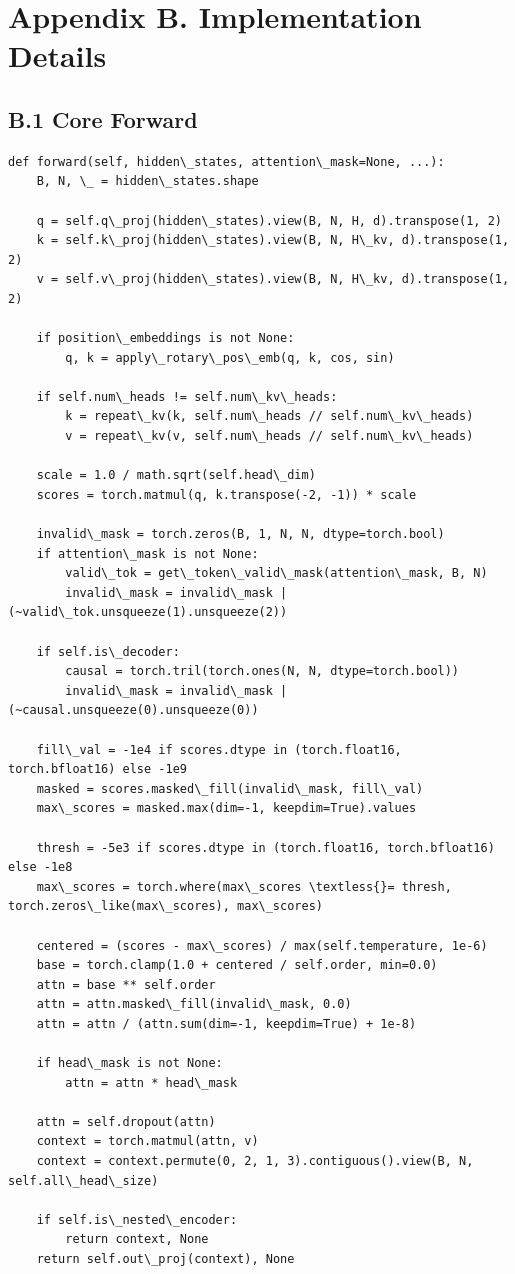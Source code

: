 \section{Appendix B. Implementation Details}

\subsection{B.1 Core Forward}

\begin{lstlisting}
def forward(self, hidden\_states, attention\_mask=None, ...):
    B, N, \_ = hidden\_states.shape
    
    q = self.q\_proj(hidden\_states).view(B, N, H, d).transpose(1, 2)
    k = self.k\_proj(hidden\_states).view(B, N, H\_kv, d).transpose(1, 2)
    v = self.v\_proj(hidden\_states).view(B, N, H\_kv, d).transpose(1, 2)
    
    if position\_embeddings is not None:
        q, k = apply\_rotary\_pos\_emb(q, k, cos, sin)
    
    if self.num\_heads != self.num\_kv\_heads:
        k = repeat\_kv(k, self.num\_heads // self.num\_kv\_heads)
        v = repeat\_kv(v, self.num\_heads // self.num\_kv\_heads)
    
    scale = 1.0 / math.sqrt(self.head\_dim)
    scores = torch.matmul(q, k.transpose(-2, -1)) * scale
    
    invalid\_mask = torch.zeros(B, 1, N, N, dtype=torch.bool)
    if attention\_mask is not None:
        valid\_tok = get\_token\_valid\_mask(attention\_mask, B, N)
        invalid\_mask = invalid\_mask | (~valid\_tok.unsqueeze(1).unsqueeze(2))
    
    if self.is\_decoder:
        causal = torch.tril(torch.ones(N, N, dtype=torch.bool))
        invalid\_mask = invalid\_mask | (~causal.unsqueeze(0).unsqueeze(0))
    
    fill\_val = -1e4 if scores.dtype in (torch.float16, torch.bfloat16) else -1e9
    masked = scores.masked\_fill(invalid\_mask, fill\_val)
    max\_scores = masked.max(dim=-1, keepdim=True).values
    
    thresh = -5e3 if scores.dtype in (torch.float16, torch.bfloat16) else -1e8
    max\_scores = torch.where(max\_scores \textless{}= thresh, torch.zeros\_like(max\_scores), max\_scores)
    
    centered = (scores - max\_scores) / max(self.temperature, 1e-6)
    base = torch.clamp(1.0 + centered / self.order, min=0.0)
    attn = base ** self.order
    attn = attn.masked\_fill(invalid\_mask, 0.0)
    attn = attn / (attn.sum(dim=-1, keepdim=True) + 1e-8)
    
    if head\_mask is not None:
        attn = attn * head\_mask
    
    attn = self.dropout(attn)
    context = torch.matmul(attn, v)
    context = context.permute(0, 2, 1, 3).contiguous().view(B, N, self.all\_head\_size)
    
    if self.is\_nested\_encoder:
        return context, None
    return self.out\_proj(context), None
\end{lstlisting}

